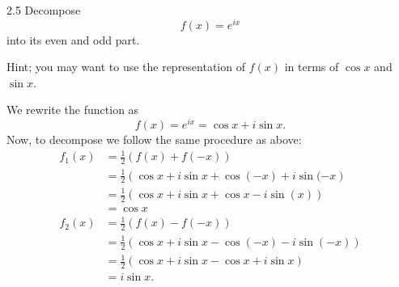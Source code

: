\begin{problem}{2.5}
Decompose
\[ 
f(x) = e^{ix}
\]
into its even and odd part.

Hint; you may want to use the representation of $f(x)$ in terms of $\cos x$ and $\sin x$.
\end{problem}

\begin{derivation}
  We rewrite the function as
  \begin{equation*}
    f(x) = e^{ix} = \cos x + i \sin x
  .\end{equation*}
  Now, to decompose we follow the same procedure as above:
  \begin{align*}
    f_1(x) &= \frac{1}{2} \left( f(x) + f(-x) \right) \\
    &= \frac{1}{2} \left( \cos x + i \sin x + \cos(-x) + i \sin(-x \right) \\
    &= \frac{1}{2} \left( \cos x + i \sin x + \cos x - i \sin (x) \right) \\
    &= \cos x \\
    f_2(x) &= \frac{1}{2} \left( f(x) - f(-x) \right) \\
    &= \frac{1}{2} \left( \cos x + i \sin x - \cos(-x) - i \sin(-x) \right) \\
    &= \frac{1}{2} \left( \cos x + i \sin x - \cos x + i \sin x \right) \\
    &= i \sin x
  .\end{align*}
\end{derivation}

